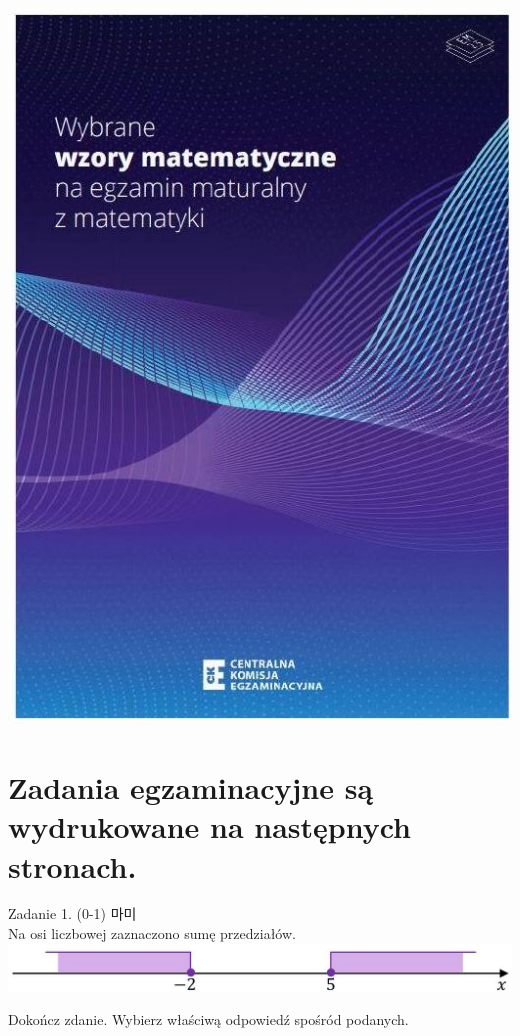 \documentclass[10pt]{article}
\begin{document}
\begin{enumerate}
\includegraphics[max width=\textwidth, center]{2024_11_21_51cb67544fb9b029f01cg-02(1)}
\end{enumerate}

\section*{Zadania egzaminacyjne są wydrukowane na następnych stronach.}
Zadanie 1. (0-1) 마미\\
Na osi liczbowej zaznaczono sumę przedziałów.\\
\includegraphics[max width=\textwidth, center]{2024_11_21_51cb67544fb9b029f01cg-04}

Dokończ zdanie. Wybierz właściwą odpowiedź spośród podanych.
\end{document}
